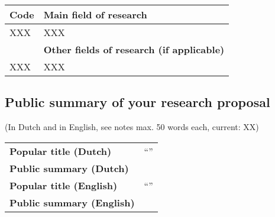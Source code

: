\begin{table}[h!]
\flushleft
\normalsize
\begin{tabular}{ll}
\hline
\T\B\textbf{Code}&\textbf{Main field of research}\\
\hline
\T\B XXX  & XXX\\
\hline
\T\B&\textbf{Other fields of research (if applicable)}\\
\hline
\T\B XXX  & XXX\\
\hline
\end{tabular}
\end{table}

\newpage
\subsection{Public summary of your research proposal}\label{sec:popsummary}
(In Dutch and in English, see notes {max.
50 words each, current: XX})

\begin{table}[h!] 
\flushleft
\normalsize
\begin{tabular}{p{14em}p{25em}}
\hline

\T\textbf{Popular title (Dutch)}&``''\B\\

\T\textbf{Public summary (Dutch)}& \B\\

\hline

\T\textbf{Popular title (English)}&``''\B\\

\T\textbf{Public summary (English)}& \B\\

\hline
\end{tabular}
\end{table}
